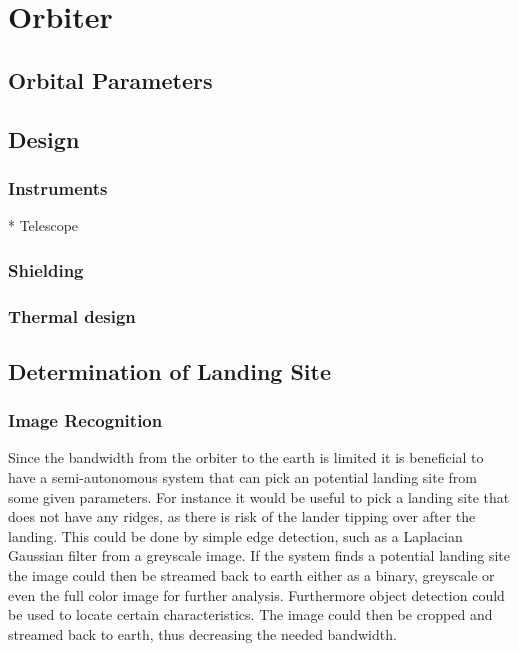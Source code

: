 \chapter{Orbiter}

\section{Orbital Parameters}

\section{Design}

\subsection{Instruments}

* Telescope

\subsection{Shielding}

\subsection{Thermal design}

\section{Determination of Landing Site}

\subsection{Image Recognition}

Since the bandwidth from the orbiter to the earth is limited it is beneficial to have a semi-autonomous system that can pick an potential landing site from some given parameters. For instance it would be useful to pick a landing site that does not have any ridges, as there is risk of the lander tipping over after the landing. This could be done by simple edge detection, such as a Laplacian Gaussian filter from a greyscale image. If the system finds a potential landing site the image could then be streamed back to earth either as a binary, greyscale or even the full color image for further analysis. Furthermore object detection could be used to locate certain characteristics. The image could then be cropped and streamed back to earth, thus decreasing the needed bandwidth.

